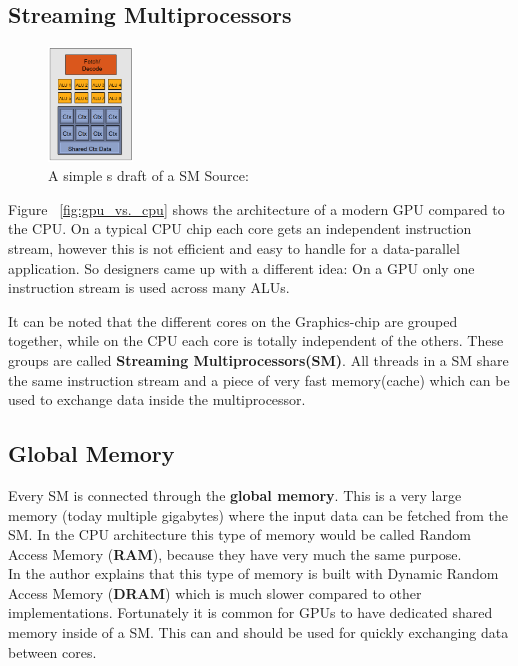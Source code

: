 \documentclass[draft, final]{vutinfth} %
\begin{document}
		\subsection{Streaming Multiprocessors}
			\begin{figure}
				\includegraphics[width=0.2\textwidth]{images/SM.PNG}
				\caption{A simple s draft of a SM Source: \cite{Introduction-to-GPUs}}
				\label{fig:SM}
				\vspace{-110pt}
			\end{figure} 
			Figure ~\ref{fig:gpu_vs._cpu} shows the architecture of a modern GPU compared to the CPU. On a typical CPU chip each core gets an independent instruction stream, however this is not efficient and easy to handle for a data-parallel application. So designers came up with a different idea: On a GPU only one instruction stream is used across many ALUs.

			It can be noted that the different cores on the Graphics-chip are grouped together, while on the CPU each core is totally independent of the others. These groups are called \textbf{Streaming Multiprocessors(SM)}. All threads in a SM share the same instruction stream and a piece of very fast memory(cache) which can be used to exchange data inside the multiprocessor.

		\subsection{Global Memory}
			Every SM is connected through the \textbf{global memory}. This is a very large memory (today multiple gigabytes) where the input data can be fetched from the SM. In the CPU architecture this type of memory would be called Random Access Memory (\textbf{RAM}), because they have very much the same purpose.\\
			In \cite{Kirk:2010:PMP:1841511} the author explains that this type of memory is built with Dynamic Random Access Memory (\textbf{DRAM}) which is much slower compared to other implementations. Fortunately it is common for GPUs to have dedicated shared memory inside of a SM. This can and should be used for quickly exchanging data between cores.
\end{document}
